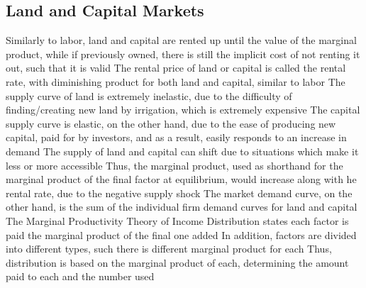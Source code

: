 \documentclass[11 pt, twoside]{article}
\newenvironment{outline*}
{
	\begin{outline}[enumerate]
	}
	{\end{outline}
}
\begin{document}
\subsection{Land and Capital Markets}
\begin{outline*}
\1 Similarly to labor, land and capital are rented up until the value of the marginal product, while if previously owned, there is still the implicit cost of not renting it out, such that it is valid
\2 The rental price of land or capital is called the rental rate, with diminishing product for both land and capital, similar to labor
\1 The supply curve of land is extremely inelastic, due to the difficulty of finding/creating new land by irrigation, which is extremely expensive
\1 The capital supply curve is elastic, on the other hand, due to the ease of producing new capital, paid for by investors, and as a result, easily responds to an increase in demand
\1 The supply of land and capital can shift due to situations which make it less or more accessible
\2 Thus, the marginal product, used as shorthand for the marginal product of the final factor at equilibrium, would increase along with he rental rate, due to the negative supply shock
\2 The market demand curve, on the other hand, is the sum of the individual firm demand curves for land and capital
\1 The Marginal Productivity Theory of Income Distribution states each factor is paid the marginal product of the final one added
\2 In addition, factors are divided into different types, such there is different marginal product for each
\2 Thus, distribution is based on the marginal product of each, determining the amount paid to each and the number used
\end{outline*}
\end{document}
